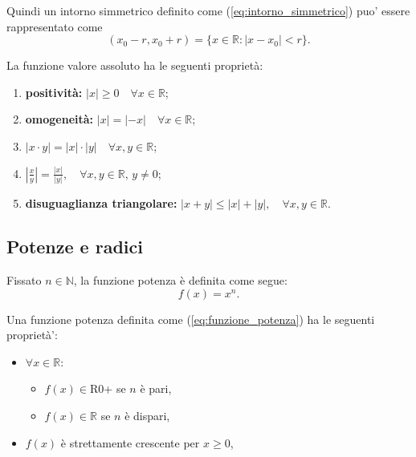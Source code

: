 Quindi un intorno simmetrico definito come (\ref{eq:intorno_simmetrico}) puo' essere rappresentato come
\begin{equation*}
    (x_0 - r, x_0 + r) = \{x\in\mathbb{R}\colon |x-x_0|<r\}.
\end{equation*}

\begin{property}\label{pro:proprieta_valore_assoluto}
    La funzione valore assoluto ha le seguenti proprietà:
    \begin{enumerate}
        \item \textbf{positività:} $|x|\geq 0 \quad\forall x\in \mathbb{R}$;
        \item \textbf{omogeneità:} $|x|=|-x| \quad\forall x\in \mathbb{R}$;
        \item $|x\cdot y|=|x|\cdot|y| \quad\forall x,y\in \mathbb{R}$;
        \item $\left|\frac{x}{y}\right|=\frac{|x|}{|y|},  \quad\forall x,y\in \mathbb{R},\, y\neq 0$;
        \item \textbf{disuguaglianza triangolare:} $|x+y|\leq|x|+|y|,  \quad\forall x,y\in \mathbb{R}$.
    \end{enumerate}
\end{property}

\subsection{Potenze e radici}
\begin{definition}
    Fissato $n\in\mathbb N$, la funzione potenza è definita come segue:
    \begin{equation}\label{eq:funzione_potenza}
        f(x)=x^n.
    \end{equation}
\end{definition}

\begin{property}
    Una funzione potenza definita come (\ref{eq:funzione_potenza}) ha le seguenti proprietà':
    \begin{itemize}
        \item $\forall x\in\mathbb R$:
        \begin{itemize}
            \item $f(x)\in$\gls{R0+} se $n$ è pari,
            \item $f(x)\in\mathbb R$ se $n$ è dispari,
        \end{itemize}
        \item $f(x)$ è strettamente crescente per $x\geq 0$,
    \end{itemize}
\end{property}

